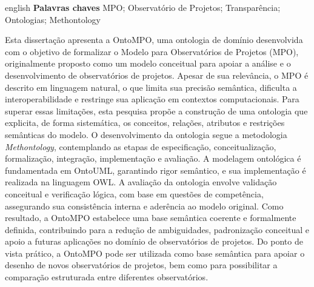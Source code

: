 \setlength{\absparsep}{18pt} %
\begin{resumo}

 \begin{otherlanguage*}{english}
\textbf{Palavras chaves}
   \vspace{\onelineskip}
     MPO;
     Observatório de Projetos;
     Transparência;
     Ontologias;
     Methontology
   \noindent 
 \end{otherlanguage*}

Esta dissertação apresenta a OntoMPO, uma ontologia de domínio desenvolvida com o objetivo de formalizar o Modelo para Observatórios de Projetos (MPO), originalmente proposto como um modelo conceitual para apoiar a análise e o desenvolvimento de observatórios de projetos. Apesar de sua relevância, o MPO é descrito em linguagem natural, o que limita sua precisão semântica, dificulta a interoperabilidade e restringe sua aplicação em contextos computacionais. Para superar essas limitações, esta pesquisa propõe a construção de uma ontologia que explicita, de forma sistemática, os conceitos, relações, atributos e restrições semânticas do modelo. O desenvolvimento da ontologia segue a metodologia \textit{Methontology}, contemplando as etapas de especificação, conceitualização, formalização, integração, implementação e avaliação. A modelagem ontológica é fundamentada em OntoUML, garantindo rigor semântico, e sua implementação é realizada na linguagem OWL. A avaliação da ontologia envolve validação conceitual e verificação lógica, com base em questões de competência, assegurando sua consistência interna e aderência ao modelo original. Como resultado, a OntoMPO estabelece uma base semântica coerente e formalmente definida, contribuindo para a redução de ambiguidades, padronização conceitual e apoio a futuras aplicações no domínio de observatórios de projetos. Do ponto de vista prático, a OntoMPO pode ser utilizada como base semântica para apoiar o desenho de novos observatórios de projetos, bem como para possibilitar a comparação estruturada entre diferentes observatórios.
\end{resumo}

